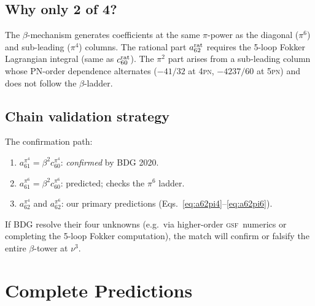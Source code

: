 \documentclass[11pt,a4paper]{article}
\theoremstyle{plain}
\theoremstyle{remark}
\newcommand{\PN}{\textsc{pn}}
\newcommand{\GSF}{\textsc{gsf}}
\begin{document}
\subsection{Why only 2 of 4?}

The $\beta$-mechanism generates coefficients at the same $\pi$-power as
the diagonal ($\pi^6$) and sub-leading ($\pi^4$) columns.
The rational part $a_{62}^{\rm rat}$ requires the 5-loop Fokker Lagrangian
integral (same as $c_{60}^{\rm rat}$).
The $\pi^2$ part arises from a sub-leading column whose PN-order dependence
alternates ($-41/32$ at 4\PN, $-4237/60$ at 5\PN) and does not follow
the $\beta$-ladder.

\subsection{Chain validation strategy}

The confirmation path:
\begin{enumerate}
  \item $a_{61}^{\pi^4} = \beta^2 c_{60}^{\pi^4}$: \emph{confirmed} by BDG 2020.
  \item $a_{61}^{\pi^6} = \beta^2 c_{60}^{\pi^6}$: predicted; checks the $\pi^6$ ladder.
  \item $a_{62}^{\pi^4}$ and $a_{62}^{\pi^6}$: our primary predictions (Eqs.~\eqref{eq:a62pi4}--\eqref{eq:a62pi6}).
\end{enumerate}
If BDG resolve their four unknowns (e.g.\ via higher-order \GSF\ numerics
or completing the 5-loop Fokker computation), the match will confirm
or falsify the entire $\beta$-tower at $\nu^3$.

\section{Complete Predictions}
\end{document}
